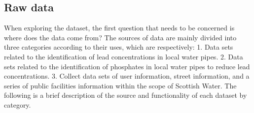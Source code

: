 \documentclass[11pt,twoside]{article}
\numberwithin{Theorem}{section}
\numberwithin{Definition}{section}
\numberwithin{Lemma}{section}
\numberwithin{Algorithm}{section}
\numberwithin{equation}{section}
\begin{document}
\subsection{Raw data}
\label{sec:raw}
When exploring the dataset, the first question that needs to be concerned is where does the data come from? The sources of data are mainly divided into three categories according to their uses, which are respectively: 1. Data sets related to the identification of lead concentrations in local water pipes. 2. Data sets related to the identification of phosphates in local water pipes to reduce lead concentrations. 3. Collect data sets of user information, street information, and a series of public facilities information within the scope of Scottish Water. The following is a brief description of the source and functionality of each dataset by category.
\end{document}

